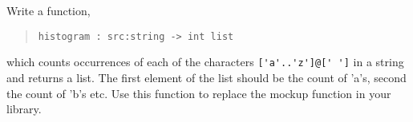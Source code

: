\label{histogram}
Write a function,
\begin{quote}
  \mbox{\lstinline!histogram : src:string -> int list!}
\end{quote}
which counts occurrences of each of the characters
\lstinline{['a'..'z']@[' ']} in a string and returns a list. The first
element of the list should be the count of 'a's, second the count of
'b's etc. Use this function to replace the mockup function in your
library.
